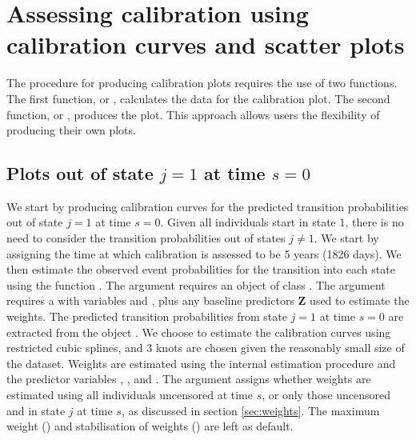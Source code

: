 \documentclass[nojss]{jss}
\begin{document}
\section[Assessing calibration using calibration curves and scatter plots]{Assessing calibration using calibration curves and scatter plots} \label{sec:calibplots}

The procedure for producing calibration plots requires the use of two functions. The first function,  or , calculates the data for the calibration plot. The second function,  or , produces the plot. This approach allows users the flexibility of producing their own plots.

\subsection[Plots out of state j = 1 at time s = 0]{Plots out of state $j = 1$ at time $s = 0$} \label{sec:plotsj1s0}

We start by producing calibration curves for the predicted transition probabilities out of state $j = 1$ at time $s = 0$. Given all individuals start in state $1$, there is no need to consider the transition probabilities out of states $j \neq 1$. We start by assigning the time at which calibration is assessed to be 5 years (1826 days). We then estimate the observed event probabilities for the transition into each state using the function . The  argument requires an object of class . The  argument requires a  with variables  and , plus any baseline predictors $\textbf{Z}$ used to estimate the weights. The predicted transition probabilities from state $j = 1$ at time $s = 0$ are extracted from the object . We choose to estimate the calibration curves using restricted cubic splines, and 3 knots are chosen given the reasonably small size of the dataset. Weights are estimated using the internal estimation procedure and the predictor variables , ,  and . The  argument assigns whether weights are estimated using all individuals uncensored at time $s$, or only those uncensored and in state $j$ at time $s$, as discussed in section \ref{sec:weights}. The maximum weight () and stabilisation of weights () are left as default.
\end{document}
